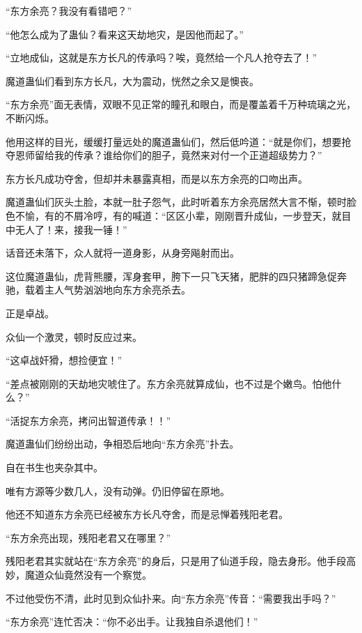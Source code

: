 
\begin{this_body}

“东方余亮？我没有看错吧？”

“他怎么成为了蛊仙？看来这天劫地灾，是因他而起了。”

“立地成仙，这就是东方长凡的传承吗？唉，竟然给一个凡人抢夺去了！”

魔道蛊仙们看到东方长凡，大为震动，恍然之余又是懊丧。

“东方余亮”面无表情，双眼不见正常的瞳孔和眼白，而是覆盖着千万种琉璃之光，不断闪烁。

他用这样的目光，缓缓打量远处的魔道蛊仙们，然后低吟道：“就是你们，想要抢夺恩师留给我的传承？谁给你们的胆子，竟然来对付一个正道超级势力？”

东方长凡成功夺舍，但却并未暴露真相，而是以东方余亮的口吻出声。

魔道蛊仙们灰头土脸，本就一肚子怨气，此时听着东方余亮居然大言不惭，顿时脸色不愉，有的不屑冷哼，有的喊道：“区区小辈，刚刚晋升成仙，一步登天，就目中无人了！来，接我一锤！”

话音还未落下，众人就将一道身影，从身旁飚射而出。

这位魔道蛊仙，虎背熊腰，浑身套甲，胯下一只飞天猪，肥胖的四只猪蹄急促奔驰，载着主人气势汹汹地向东方余亮杀去。

正是卓战。

众仙一个激灵，顿时反应过来。

“这卓战奸猾，想捡便宜！”

“差点被刚刚的天劫地灾唬住了。东方余亮就算成仙，也不过是个嫩鸟。怕他什么？”

“活捉东方余亮，拷问出智道传承！！”

魔道蛊仙们纷纷出动，争相恐后地向“东方余亮”扑去。

自在书生也夹杂其中。

唯有方源等少数几人，没有动弹。仍旧停留在原地。

他还不知道东方余亮已经被东方长凡夺舍，而是忌惮着残阳老君。

“东方余亮出现，残阳老君又在哪里？”

残阳老君其实就站在“东方余亮”的身后，只是用了仙道手段，隐去身形。他手段高妙，魔道众仙竟然没有一个察觉。

不过他受伤不清，此时见到众仙扑来。向“东方余亮”传音：“需要我出手吗？”

“东方余亮”连忙否决：“你不必出手。让我独自杀退他们！”


\end{this_body}
